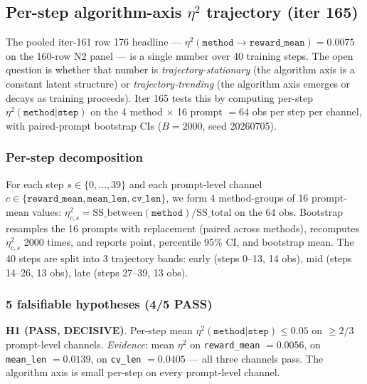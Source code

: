 \subsection{Per-step algorithm-axis \texorpdfstring{$\eta^2$}{eta\textasciicircum 2} trajectory (iter 165)}
\label{sec:p5-iter165-per-step}

The pooled iter-161 row 176 headline --- $\eta^2(\texttt{method} \to \texttt{reward\_mean}){=}0.0075$ on the 160-row N2 panel --- is a single number over 40 training steps. The open question is whether that number is \emph{trajectory-stationary} (the algorithm axis is a constant latent structure) or \emph{trajectory-trending} (the algorithm axis emerges or decays as training proceeds). Iter 165 tests this by computing per-step $\eta^2(\texttt{method}|\texttt{step})$ on the 4 method $\times$ 16 prompt $= 64$ obs per step per channel, with paired-prompt bootstrap CIs ($B{=}2000$, seed 20260705).

\subsubsection{Per-step decomposition}
\label{sec:p5-iter165-decomposition}
For each step $s \in \{0, \dots, 39\}$ and each prompt-level channel $c \in \{\texttt{reward\_mean}, \texttt{mean\_len}, \texttt{cv\_len}\}$, we form 4 method-groups of 16 prompt-mean values:
$\eta^2_{c,s} = \mathrm{SS\_between}(\texttt{method}) / \mathrm{SS\_total}$
on the 64 obs. Bootstrap resamples the 16 prompts with replacement (paired across methods), recomputes $\eta^2_{c,s}$ 2000 times, and reports point, percentile 95\% CI, and bootstrap mean. The 40 steps are split into 3 trajectory bands: early (steps 0--13, 14 obs), mid (steps 14--26, 13 obs), late (steps 27--39, 13 obs).

\subsubsection{5 falsifiable hypotheses (4/5 PASS)}
\label{sec:p5-iter165-hypotheses}
\textbf{H1 (PASS, DECISIVE)}. Per-step mean $\eta^2(\texttt{method}|\texttt{step}) \le 0.05$ on $\ge 2/3$ prompt-level channels. \emph{Evidence}: mean $\eta^2$ on \texttt{reward\_mean} $= 0.0056$, on \texttt{mean\_len} $= 0.0139$, on \texttt{cv\_len} $= 0.0405$ --- all three channels pass. The algorithm axis is small per-step on every prompt-level channel.

